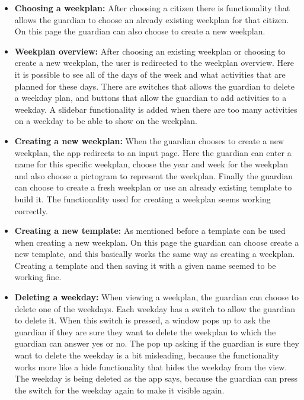 \begin{itemize}
    \item \textbf{Choosing a weekplan:} After choosing a citizen there is functionality that allows the guardian to choose an already existing weekplan for that citizen. 
    On this page the guardian can also choose to create a new weekplan.
    \\
    \item \textbf{Weekplan overview:} After choosing an existing weekplan or choosing to create a new weekplan, the user is redirected to the weekplan overview. 
    Here it is possible to see all of the days of the week and what activities that are planned for these days. 
    There are switches that allows the guardian to delete a weekday plan, and buttons that allow the guardian to add activities to a weekday. 
    A slidebar functionality is added when there are too many activities on a weekday to be able to show on the weekplan.
    \\
    \item \textbf{Creating a new weekplan:} When the guardian chooses to create a new weekplan, the app redirects to an input page. 
    Here the guardian can enter a name for this specific weekplan, choose the year and week for the weekplan and also choose a pictogram to represent the weekplan. 
    Finally the guardian can choose to create a fresh weekplan or use an already existing template to build it. The functionality used for creating a weekplan seems working correctly.
    \\
    \item \textbf{Creating a new template:} As mentioned before a template can be used when creating a new weekplan. 
    On this page the guardian can choose create a new template, and this basically works the same way as creating a weekplan. 
    Creating a template and then saving it with a given name seemed to be working fine.
    \\
    \item \textbf{Deleting a weekday:} When viewing a weekplan, the guardian can choose to delete one of the weekdays. Each weekday has a switch to allow the guardian to delete it.
    When this switch is pressed, a window pops up to ask the guardian if they are sure they want to delete the weekplan to which the guardian can answer yes or no. 
    The pop up asking if the guardian is sure they want to delete the weekday is a bit misleading, because the functionality works more like a hide functionality that hides the weekday from the view. 
    The weekday is being deleted as the app says, because the guardian can press the switch for the weekday again to make it visible again.

\end{itemize}
